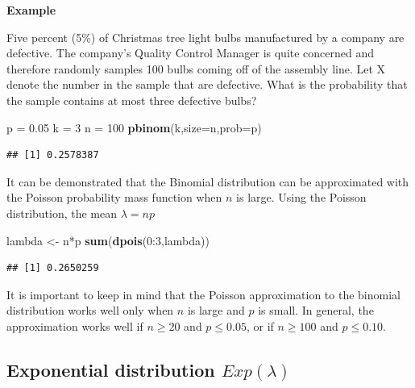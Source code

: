 \documentclass[]{article}
\newenvironment{Shaded}{\begin{snugshade}}{\end{snugshade}}
\newcommand{\KeywordTok}[1]{\textcolor[rgb]{0.13,0.29,0.53}{\textbf{{#1}}}}
\newcommand{\DataTypeTok}[1]{\textcolor[rgb]{0.13,0.29,0.53}{{#1}}}
\newcommand{\DecValTok}[1]{\textcolor[rgb]{0.00,0.00,0.81}{{#1}}}
\newcommand{\FloatTok}[1]{\textcolor[rgb]{0.00,0.00,0.81}{{#1}}}
\newcommand{\StringTok}[1]{\textcolor[rgb]{0.31,0.60,0.02}{{#1}}}
\newcommand{\NormalTok}[1]{{#1}}
\numberwithin{equation}{section}
\begin{document}
\textbf{Example}

Five percent (5\%) of Christmas tree light bulbs manufactured by a
company are defective. The company's Quality Control Manager is quite
concerned and therefore randomly samples 100 bulbs coming off of the
assembly line. Let X denote the number in the sample that are defective.
What is the probability that the sample contains at most three defective
bulbs?

\begin{Shaded}
\begin{Highlighting}[]
\NormalTok{p =}\StringTok{ }\FloatTok{0.05}
\NormalTok{k =}\StringTok{ }\DecValTok{3}
\NormalTok{n =}\StringTok{ }\DecValTok{100}
\KeywordTok{pbinom}\NormalTok{(k,}\DataTypeTok{size=}\NormalTok{n,}\DataTypeTok{prob=}\NormalTok{p)}
\end{Highlighting}
\end{Shaded}

\begin{verbatim}
## [1] 0.2578387
\end{verbatim}

It can be demonstrated that the Binomial distribution can be
approximated with the Poisson probability mass function when \(n\) is
large. Using the Poisson distribution, the mean \(\lambda = np\)

\begin{Shaded}
\begin{Highlighting}[]
\NormalTok{lambda <-}\StringTok{ }\NormalTok{n*p}
\KeywordTok{sum}\NormalTok{(}\KeywordTok{dpois}\NormalTok{(}\DecValTok{0}\NormalTok{:}\DecValTok{3}\NormalTok{,lambda))}
\end{Highlighting}
\end{Shaded}

\begin{verbatim}
## [1] 0.2650259
\end{verbatim}

It is important to keep in mind that the Poisson approximation to the
binomial distribution works well only when \(n\) is large and \(p\) is
small. In general, the approximation works well if \(n \geq 20\) and
\(p\leq0.05\), or if \(n\geq 100\) and \(p\leq 0.10\).

\subsection{\texorpdfstring{Exponential distribution
\(Exp(\lambda)\)}{Exponential distribution Exp(\textbackslash{}lambda)}}\label{exponential-distribution-explambda}
\end{document}
